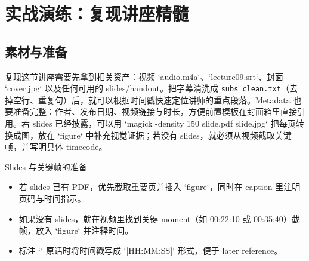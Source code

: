 \section{实战演练：复现讲座精髓}

\subsection{素材与准备}
复现这节讲座需要先拿到相关资产：视频 `audio.m4a`、`lecture09.srt`、封面 `cover.jpg` 以及任何可用的 slides/handout。把字幕清洗成 \texttt{subs\_clean.txt}（去掉空行、重复句）后，就可以根据时间戳快速定位讲师的重点段落。Metadata 也要准备完整：作者、发布日期、视频链接与时长，方便前置模板在封面箱里直接引用。若 slides 已经披露，可以用 `magick -density 150 slide.pdf slide.jpg` 把每页转换成图，放在 `figure` 中补充视觉证据；若没有 slides，就必须从视频截取关键帧，并写明具体 timecode。

\begin{knowledgebox}{Slides 与关键帧的准备}
\begin{itemize}
    \item 若 slides 已有 PDF，优先截取重要页并插入 `figure`，同时在 caption 里注明页码与时间指示。
    \item 如果没有 slides，就在视频里找到关键 moment（如 00:22:10 或 00:35:40）截帧，放入 `figure` 并注释时间。
    \item 标注 `\textit{}` 原话时将时间戳写成 `[HH:MM:SS]` 形式，便于 later reference。
\end{itemize}
\end{knowledgebox}

